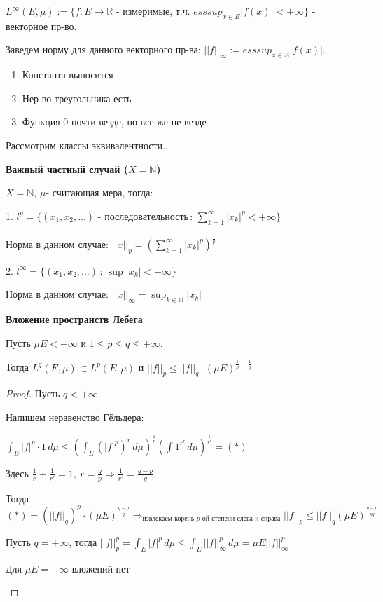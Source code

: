 \begin{definition}
    $L^{\infty} (E, \mu) := \{ f: E \rightarrow \bar{\mathbb{R}}$ - измеримые, т.ч. $esssup_{x\in E} |f(x)| < +\infty \}$ - векторное пр-во.

    Заведем норму для данного векторного пр-ва: $|| f ||_{\infty} := esssup_{x\in E} |f(x)|$.

    \begin{enumerate}
        \item Константа выносится
        \item Нер-во треугольника есть
        \item Функция 0 почти везде, но все же не везде
    \end{enumerate}

    Рассмотрим классы эквивалентности...

    \textbf{Важный частный случай ($X = \mathbb{N}$)}

    $X = \mathbb{N}$, $\mu$- считающая мера, тогда:

    1. $l^p = \{ (x_1, x_2, \ldots) \text{ - последовательность} \, : \, \sum_{k = 1}^{\infty} |x_k|^p < +\infty \}$

        Норма в данном случае: $|| x ||_p = \left( \sum_{k = 1}^{\infty} |x_k|^p \right)^{\frac{1}{p}}$

    2. $l^\infty = \{ (x_1, x_2, \ldots) \, : \, \sup |x_k| < +\infty \}$

        Норма в данном случае: $|| x ||_{\infty} = \sup_{k \in \mathbb{N}} |x_k|$
\end{definition}

\begin{theorem}
    \textbf{Вложение пространств Лебега}

    Пусть $\mu E < +\infty$ и $1 \leqslant p \leqslant q \leqslant +\infty$.

    Тогда $L^q (E, \mu) \subset L^p (E, \mu)$ и $||f||_p \leqslant ||f||_q \cdot (\mu E)^{\frac{1}{p}-\frac{1}{q}}$
\end{theorem}

\begin{proof}
    Пусть $q < +\infty$.

    Напишем неравенство Гёльдера:

    $\int_E |f|^p \cdot 1 \, d\mu \leqslant \left( \int_E \left(|f|^p\right)^{r} \, d\mu \right)^{\frac{1}{r}} \left( \int 1^{r'} \, d\mu \right)^{\frac{1}{r'}} = (*)$

    Здесь $\frac{1}{r} + \frac{1}{r'} = 1, \ r = \frac{q}{p} \Rightarrow \frac{1}{r'} = \frac{q - p}{q}$.

    Тогда $(*) = \left(||f||_q\right)^p \cdot (\mu E)^{\frac{q - p}{q}} \Rightarrow_{\text{извлекаем корень $p$-ой степени слева и справа}} ||f||_p \leqslant ||f||_q (\mu E)^{\frac{q - p}{pq}}$

    Пусть $q = +\infty$, тогда $||f||_p^p = \int_E |f|^p \, d\mu \leqslant \int_E ||f||_\infty^p \, d\mu = \mu E ||f||_\infty^p$

    \begin{remark}
        Для $\mu E = +\infty$ вложений нет
    \end{remark}
\end{proof}

